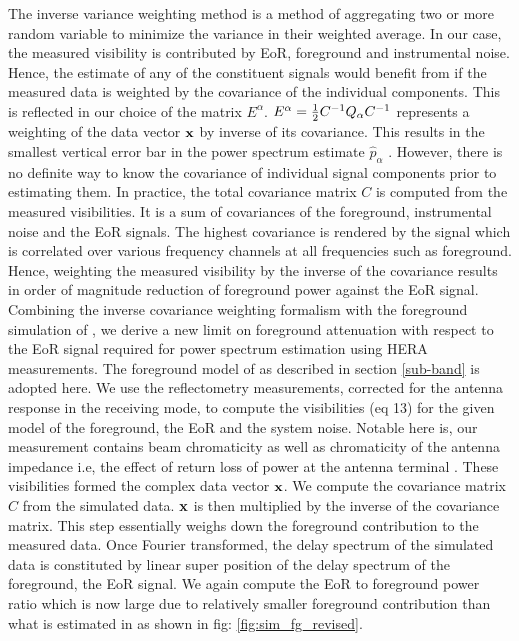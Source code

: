 \documentclass[twocolumn]{emulateapj}
\begin{document}
    The inverse variance weighting method is a method of aggregating two or more
    random variable to minimize the variance in their weighted average. In our
    case, the measured visibility is contributed by EoR, foreground and
    instrumental noise. Hence, the estimate of any of the constituent signals would
    benefit from if the measured data is weighted by the covariance of the
    individual components. This is reflected in our choice of the matrix
    $E^{\alpha}$.  $E^{\alpha} = {1 \over 2} C^{-1} Q_{\alpha} C^{-1}$ represents a
    weighting of the data vector $\bold x$ by inverse of its covariance. This
    results in the smallest vertical error bar in the power spectrum estimate $\hat
    p_{\alpha}$ \citep{liu_tegmark2011}.  However, there is no definite way to know the
    covariance of individual signal components prior to estimating them. In
    practice, the total covariance matrix $C$ is computed from the measured
    visibilities. It is a sum of covariances of the foreground, instrumental noise
    and the EoR signals. The highest covariance is rendered by the signal which is
    correlated over various frequency channels at all frequencies such as
    foreground. Hence, weighting the measured visibility by the inverse of the
    covariance results in order of magnitude reduction of foreground power against
    the EoR signal. \\ 
    Combining the inverse covariance weighting formalism with the
    foreground simulation of \cite{Thyagarajan_et_al2016}, we derive a new limit on
    foreground attenuation with respect to the EoR signal required for
    power spectrum estimation using HERA measurements. The foreground model of
    \cite{Thyagarajan_et_al2016} as described in section \ref{sub-band} is adopted here. We use
    the reflectometry measurements, corrected for the antenna response in the
    receiving mode, to compute the visibilities (eq 13) for the given model of the
    foreground, the EoR and the system noise. Notable here is, our measurement contains 
     beam chromaticity as well as chromaticity of the antenna impedance i.e, the effect 
     of return loss of power at the antenna terminal . These visibilities formed the complex
    data vector $\bold x$. We compute the covariance matrix $C$ from the simulated
    data. $\bold x$ is then multiplied by the inverse of the covariance matrix.
    This step essentially weighs down the foreground contribution to the measured
    data. Once Fourier transformed, the delay spectrum of the simulated data is
    constituted by linear super position of the delay spectrum of the foreground,
    the EoR signal.  We again compute the EoR to foreground power ratio which is
    now large due to relatively smaller foreground contribution than what is estimated in \cite{Thyagarajan_et_al2016} as shown       in fig: \ref{fig:sim_fg_revised}. 
    
\end{document}
